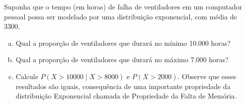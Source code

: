 %
%


\begin{exercicioBanco}[\valorquestao]
Suponha que o tempo (em horas) de falha de ventiladores em um computador pessoal possa ser modelado por uma distribuição exponencial, com média de 3300.
%
\begin{enumerate}[(a)]
    \item Qual a proporção de ventiladores que durará no mínimo 10.000 horas?
    \item Qual a proporção de ventiladores que durará no máximo 7.000 horas?
    \item Calcule \(P(X > 10000 \mid X > 8000)\) e \(P (X > 2000)\). Observe que esses resultados são iguais, consequência de uma importante propriedade da distribuição Exponencial chamada de Propriedade da Falta de Memória.
\end{enumerate}
%
\end{exercicioBanco}

